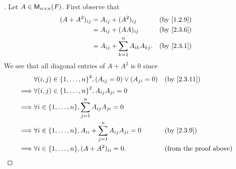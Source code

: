 \begin{proof}[]
  Let \(A \in \ms[n][n][\F]\).
  First observe that
  \begin{align*}
    (A + A^2)_{i j} & = A_{i j} + (A^2)_{i j}                     &  & \by{1.2.9} \\
                    & = A_{i j} + (AA)_{i j}                      &  & \by{2.3.6} \\
                    & = A_{i j} + \sum_{k = 1}^n A_{i k} A_{k j}. &  & \by{2.3.1}
  \end{align*}
  We see that all diagonal entries of \(A + A^2\) is \(0\) since
  \begin{align*}
             & \forall (i, j) \in \set{1, \dots, n}^2, (A_{i j} = 0) \lor (A_{j i} = 0)      &  & \by{2.3.11}                   \\
    \implies & \forall (i, j) \in \set{1, \dots, n}^2, A_{i j} A_{j i} = 0                                                      \\
    \implies & \forall i \in \set{1, \dots, n}, \sum_{j = 1}^n A_{i j} A_{j i} = 0                                              \\
    \implies & \forall i \in \set{1, \dots, n}, A_{i i} + \sum_{j = 1}^n A_{i j} A_{j i} = 0 &  & \by{2.3.9}                    \\
    \implies & \forall i \in \set{1, \dots, n}, (A + A^2)_{i i} = 0.                         &  & \text{(from the proof above)}
  \end{align*}


\end{proof}
